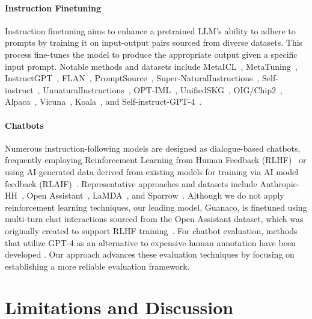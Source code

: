 \paragraph{Instruction Finetuning} Instruction finetuning aims to enhance a pretrained LLM’s ability to adhere to prompts by training it on input-output pairs sourced from diverse datasets. This process fine-tunes the model to produce the appropriate output given a specific input prompt. Notable methods and datasets include MetaICL~\citep{min2021metaicl}, MetaTuning~\citep{zhong2021adapting}, InstructGPT~\citep{ouyang2022training}, FLAN~\citep{wei2021finetuned,chung2022scaling}, PromptSource~\citep{bach2022promptsource}, Super-NaturalInstructions~\citep{wang2022super,sanh2021multitask}, Self-instruct~\citep{wang2022self}, UnnaturalInstructions~\citep{honovich2022unnatural}, OPT-IML~\citep{iyer2022opt}, UnifiedSKG~\citep{xie2022unifiedskg}, OIG/Chip2~\citep{laion2023}, Alpaca~\citep{alpaca}, Vicuna~\citep{vicuna2023}, Koala~\citep{koala_blogpost_2023}, and Self-instruct-GPT-4~\citep{peng2023instruction}.

\paragraph{Chatbots} Numerous instruction-following models are designed as dialogue-based chatbots, frequently employing Reinforcement Learning from Human Feedback (RLHF)~\citep{christiano2017deep} or using AI-generated data derived from existing models for training via AI model feedback (RLAIF)~\citep{bai2022constitutional}. Representative approaches and datasets include Anthropic-HH~\citep{askell2021general,bai2022training}, Open Assistant~\citep{kopf2023openassistant}, LaMDA~\citep{thoppilan2022lamda}, and Sparrow~\citep{glaese2022improving}. Although we do not apply reinforcement learning techniques, our leading model, Guanaco, is finetuned using multi-turn chat interactions sourced from the Open Assistant dataset, which was originally created to support RLHF training~\citep{kopf2023openassistant}. For chatbot evaluation, methods that utilize GPT-4 as an alternative to expensive human annotation have been developed \citep{vicuna2023,peng2023instruction}. Our approach advances these evaluation techniques by focusing on establishing a more reliable evaluation framework.

\section{Limitations and Discussion}

